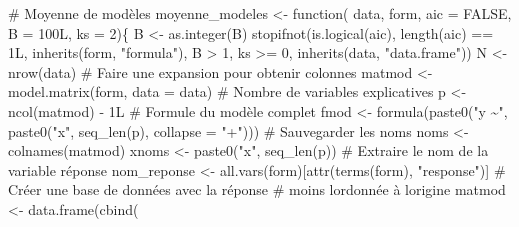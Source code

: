 \documentclass[
  11pt,
  letterpaper,
]{scrbook}
\newenvironment{Shaded}{\begin{snugshade}}{\end{snugshade}}
\newcommand{\AttributeTok}[1]{\textcolor[rgb]{0.40,0.45,0.13}{#1}}
\newcommand{\CommentTok}[1]{\textcolor[rgb]{0.37,0.37,0.37}{#1}}
\newcommand{\ConstantTok}[1]{\textcolor[rgb]{0.56,0.35,0.01}{#1}}
\newcommand{\ControlFlowTok}[1]{\textcolor[rgb]{0.00,0.23,0.31}{#1}}
\newcommand{\DecValTok}[1]{\textcolor[rgb]{0.68,0.00,0.00}{#1}}
\newcommand{\FunctionTok}[1]{\textcolor[rgb]{0.28,0.35,0.67}{#1}}
\newcommand{\NormalTok}[1]{\textcolor[rgb]{0.00,0.23,0.31}{#1}}
\newcommand{\OtherTok}[1]{\textcolor[rgb]{0.00,0.23,0.31}{#1}}
\newcommand{\SpecialCharTok}[1]{\textcolor[rgb]{0.37,0.37,0.37}{#1}}
\newcommand{\StringTok}[1]{\textcolor[rgb]{0.13,0.47,0.30}{#1}}
\theoremstyle{definition}
\theoremstyle{remark}
\begin{document}
\begin{Shaded}
\begin{Highlighting}[]
\CommentTok{\# Moyenne de modèles}
\NormalTok{moyenne\_modeles }\OtherTok{\textless{}{-}} \ControlFlowTok{function}\NormalTok{(}
\NormalTok{    data, }
\NormalTok{    form, }
    \AttributeTok{aic =} \ConstantTok{FALSE}\NormalTok{, }
    \AttributeTok{B =}\NormalTok{ 100L,}
    \AttributeTok{ks =} \DecValTok{2}\NormalTok{)\{}
\NormalTok{  B }\OtherTok{\textless{}{-}} \FunctionTok{as.integer}\NormalTok{(B)}
  \FunctionTok{stopifnot}\NormalTok{(}\FunctionTok{is.logical}\NormalTok{(aic),}
            \FunctionTok{length}\NormalTok{(aic) }\SpecialCharTok{==}\NormalTok{ 1L,}
            \FunctionTok{inherits}\NormalTok{(form, }\StringTok{"formula"}\NormalTok{),}
\NormalTok{            B }\SpecialCharTok{\textgreater{}} \DecValTok{1}\NormalTok{,}
\NormalTok{            ks }\SpecialCharTok{\textgreater{}=} \DecValTok{0}\NormalTok{,}
            \FunctionTok{inherits}\NormalTok{(data, }\StringTok{"data.frame"}\NormalTok{))}
\NormalTok{  N }\OtherTok{\textless{}{-}} \FunctionTok{nrow}\NormalTok{(data)}
  \CommentTok{\# Faire une expansion pour obtenir colonnes}
\NormalTok{  matmod }\OtherTok{\textless{}{-}} \FunctionTok{model.matrix}\NormalTok{(form, }\AttributeTok{data =}\NormalTok{ data)}
  \CommentTok{\# Nombre de variables explicatives}
\NormalTok{  p }\OtherTok{\textless{}{-}} \FunctionTok{ncol}\NormalTok{(matmod) }\SpecialCharTok{{-}}\NormalTok{ 1L}
  \CommentTok{\# Formule du modèle complet}
\NormalTok{  fmod }\OtherTok{\textless{}{-}} \FunctionTok{formula}\NormalTok{(}\FunctionTok{paste0}\NormalTok{(}\StringTok{"y \textasciitilde{}"}\NormalTok{, }\FunctionTok{paste0}\NormalTok{(}\StringTok{"x"}\NormalTok{, }\FunctionTok{seq\_len}\NormalTok{(p), }\AttributeTok{collapse =} \StringTok{"+"}\NormalTok{)))}
  \CommentTok{\# Sauvegarder les noms}
\NormalTok{  noms }\OtherTok{\textless{}{-}} \FunctionTok{colnames}\NormalTok{(matmod)}
\NormalTok{  xnoms }\OtherTok{\textless{}{-}} \FunctionTok{paste0}\NormalTok{(}\StringTok{"x"}\NormalTok{, }\FunctionTok{seq\_len}\NormalTok{(p))}
  \CommentTok{\# Extraire le nom de la variable réponse}
\NormalTok{  nom\_reponse }\OtherTok{\textless{}{-}} \FunctionTok{all.vars}\NormalTok{(form)[}\FunctionTok{attr}\NormalTok{(}\FunctionTok{terms}\NormalTok{(form), }\StringTok{"response"}\NormalTok{)]}
  \CommentTok{\# Créer une base de données avec la réponse}
  \CommentTok{\# moins l\textquotesingle{}ordonnée à l\textquotesingle{}origine}
\NormalTok{  matmod }\OtherTok{\textless{}{-}} \FunctionTok{data.frame}\NormalTok{(}\FunctionTok{cbind}\NormalTok{(}

\end{Highlighting}
\end{Shaded}
\end{document}
